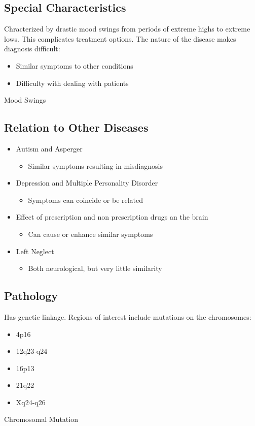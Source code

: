 \documentclass[journal]{IEEEtran}
\begin{document}
\subsection{Special Characteristics}
Chracterized by drastic mood swings from periods of extreme highs to extreme lows. This complicates treatment options. The nature of the disease makes diagnosis difficult:
\begin{itemize}
\item Similar symptoms to other conditions
\item Difficulty with dealing with patients
\end{itemize}
\begin{IEEEkeywords}
Mood Swings
\end{IEEEkeywords}
\subsection{Relation to Other Diseases}
\begin{itemize}
\item Autism and Asperger
\begin{itemize}
\item Similar symptoms resulting in misdiagnosis
\end{itemize}
\item Depression and Multiple Personality Disorder
\begin{itemize}
\item Symptoms can coincide or be related
\end{itemize}
\item Effect of prescription and non prescription drugs an the brain
\begin{itemize}
\item Can cause or enhance similar symptoms
\end{itemize}
\item Left Neglect
\begin{itemize}
\item Both neurological, but very little similarity
\end{itemize}
\end{itemize}
\subsection{Pathology}
Has genetic linkage. Regions of interest include mutations on the chromosomes:
\begin{itemize}
\item 4p16
\item 12q23-q24
\item 16p13
\item 21q22
\item Xq24-q26
\end{itemize}
\begin{IEEEkeywords}
Chromosomal Mutation
\end{IEEEkeywords}
\end{document}
